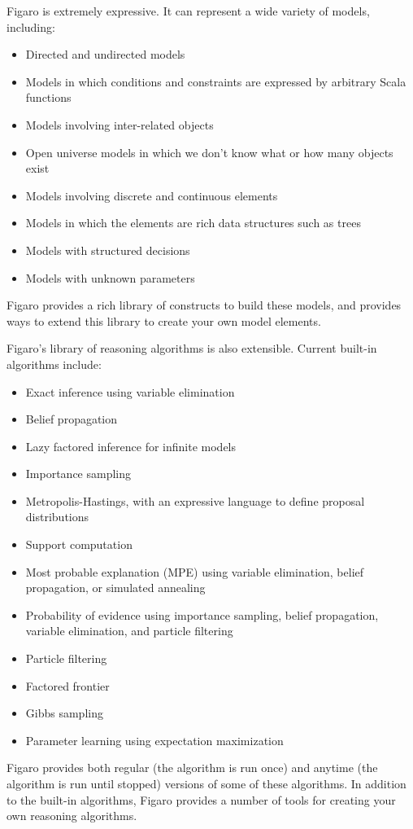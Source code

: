 Figaro is extremely expressive. It can represent a wide variety of models, including:
\begin{itemize}
\item Directed and undirected models
\item Models in which conditions and constraints are expressed by arbitrary Scala functions
\item Models involving inter-related objects
\item Open universe models in which we don't know what or how many objects exist
\item Models involving discrete and continuous elements
\item Models in which the elements are rich data structures such as trees
\item Models with structured decisions
\item Models with unknown parameters
\end{itemize}

Figaro provides a rich library of constructs to build these models, and provides ways to extend this library to create your own model elements.

Figaro's library of reasoning algorithms is also extensible. Current built-in algorithms include:
\begin{itemize}
\item Exact inference using variable elimination
\item Belief propagation
\item Lazy factored inference for infinite models
\item Importance sampling
\item Metropolis-Hastings, with an expressive language to define proposal distributions
\item Support computation
\item Most probable explanation (MPE) using variable elimination, belief propagation, or simulated annealing
\item Probability of evidence using importance sampling, belief propagation, variable elimination, and particle filtering
\item Particle filtering
\item Factored frontier
\item Gibbs sampling
\item Parameter learning using expectation maximization
\end{itemize}

Figaro provides both regular (the algorithm is run once) and anytime (the algorithm is run until stopped) versions of some of these algorithms. In addition to the built-in algorithms, Figaro provides a number of tools for creating your own reasoning algorithms.


